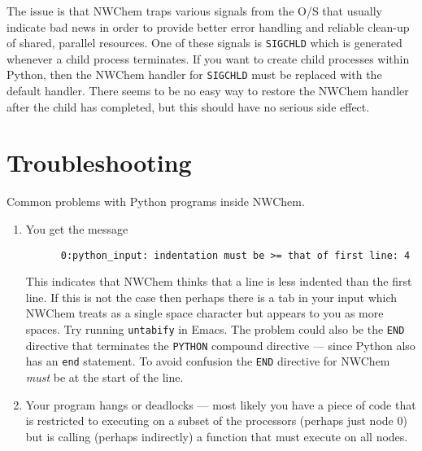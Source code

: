 The issue is that NWChem traps various signals from the O/S that
usually indicate bad news in order to provide better error handling
and reliable clean-up of shared, parallel resources.  One of these
signals is \verb+SIGCHLD+ which is generated whenever a child process
terminates.  If you want to create child processes within Python, then
the NWChem handler for \verb+SIGCHLD+ must be replaced with the
default handler.  There seems to be no easy way to restore the
NWChem handler after the child has completed, but this should have
no serious side effect.

\section{Troubleshooting}

Common problems with Python programs inside NWChem.

\begin{enumerate}
\item You get the message
\begin{verbatim}
      0:python_input: indentation must be >= that of first line: 4
\end{verbatim}
This indicates that NWChem thinks that a line is less indented than
the first line.  If this is not the case then perhaps there is a tab
in your input which NWChem treats as a single space character but
appears to you as more spaces. Try running \verb+untabify+ in Emacs.
The problem could also be the \verb+END+ directive that terminates the
\verb+PYTHON+ compound directive --- since Python also has an
\verb+end+ statement.  To avoid confusion the \verb+END+ directive
for NWChem {\em must} be at the start of the line.

\item Your program hangs or deadlocks --- most likely you have a piece
of code that is restricted to executing on a subset of the processors
(perhaps just node 0) but is calling (perhaps indirectly) a function
that must execute on all nodes.  

\end{enumerate}
